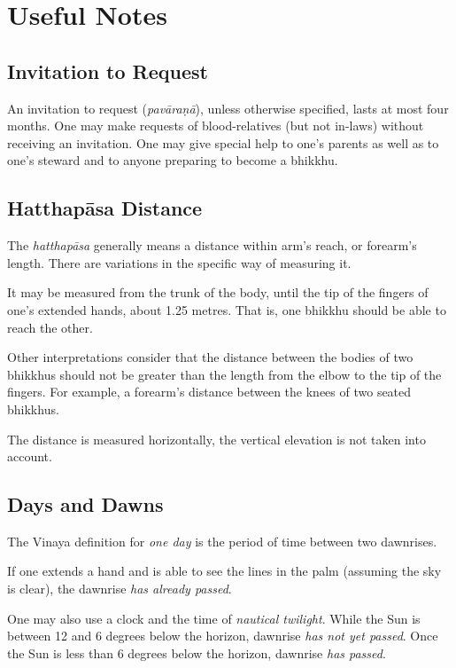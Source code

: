 \chapter{Useful Notes}

\vspace*{-2\baselineskip}

\section*{Invitation to Request}

An invitation to request (\emph{pavāraṇā}), unless otherwise specified, lasts at
most four months. One may make requests of blood-relatives (but not in-laws)
without receiving an invitation. One may give special help to one's parents as
well as to one's steward and to anyone preparing to become a bhikkhu.\\

\section*{Hatthapāsa Distance}

The \emph{hatthapāsa} generally means a distance within arm's reach, or
forearm's length. There are variations in the specific way of measuring it.

It may be measured from the trunk of the body, until the tip of the fingers of
one's extended hands, about 1.25 metres. That is, one bhikkhu should be able to
reach the other.

Other interpretations consider that the distance between the bodies of two
bhikkhus should not be greater than the length from the elbow to the tip of the
fingers. For example, a forearm's distance between the knees of two seated
bhikkhus.

The distance is measured horizontally, the vertical elevation is not taken into
account.

\section*{Days and Dawns}

The Vinaya definition for \emph{one day} is the period of time between two
dawnrises.

If one extends a hand and is able to see the lines in the palm (assuming the sky is clear), the dawnrise
\emph{has already passed}.

One may also use a clock and the time of \emph{nautical twilight}. While the Sun
is between 12 and 6 degrees below the horizon, dawnrise \emph{has not yet
  passed}. Once the Sun is less than 6 degrees below the horizon, dawnrise
\emph{has passed}.

